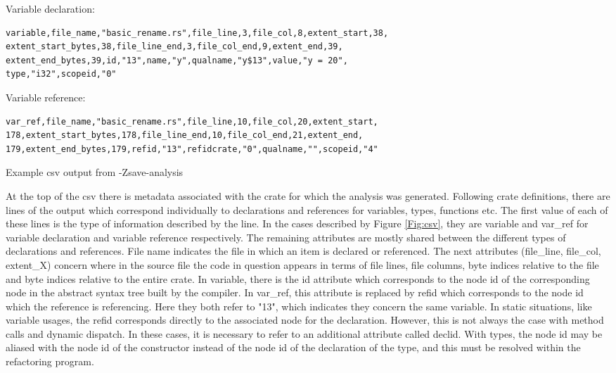 \begin{fig}
\vspace{5mm}
\noindent
Variable declaration:
\begin{verbatim}
variable,file_name,"basic_rename.rs",file_line,3,file_col,8,extent_start,38,
extent_start_bytes,38,file_line_end,3,file_col_end,9,extent_end,39,
extent_end_bytes,39,id,"13",name,"y",qualname,"y$13",value,"y = 20",
type,"i32",scopeid,"0"
\end{verbatim}

\noindent
Variable reference:
\begin{verbatim}
var_ref,file_name,"basic_rename.rs",file_line,10,file_col,20,extent_start,
178,extent_start_bytes,178,file_line_end,10,file_col_end,21,extent_end,
179,extent_end_bytes,179,refid,"13",refidcrate,"0",qualname,"",scopeid,"4"
\end{verbatim}

\caption{Example csv output from -Zsave-analysis}
\label{Fig:csv}
\end{fig}

At the top of the csv there is metadata associated with the crate for which the analysis was generated. Following crate definitions, there are lines of the output which correspond individually to declarations and references for variables, types, functions etc. The first value of each of these lines is the type of information described by the line. In the cases described by Figure \ref{Fig:csv}, they are variable and var\_ref for variable declaration and variable reference respectively. The remaining attributes are mostly shared between the different types of declarations and references. File name indicates the file in which an item is declared or referenced. The next attributes (file\_line, file\_col, extent\_X) concern where in the source file the code in question appears in terms of file lines, file columns, byte indices relative to the file and byte indices relative to the entire crate. In variable, there is the id attribute which corresponds to the node id of the corresponding node in the abstract syntax tree built by the compiler. In var\_ref, this attribute is replaced by refid which corresponds to the node id which the reference is referencing. Here they both refer to "13", which indicates they concern the same variable. In static situations, like variable usages, the refid corresponds directly to the associated node for the declaration. However, this is not always the case with method calls and dynamic dispatch. In these cases, it is necessary to refer to an additional attribute called declid. With types, the node id may be aliased with the node id of the constructor instead of the node id of the declaration of the type, and this must be resolved within the refactoring program.

